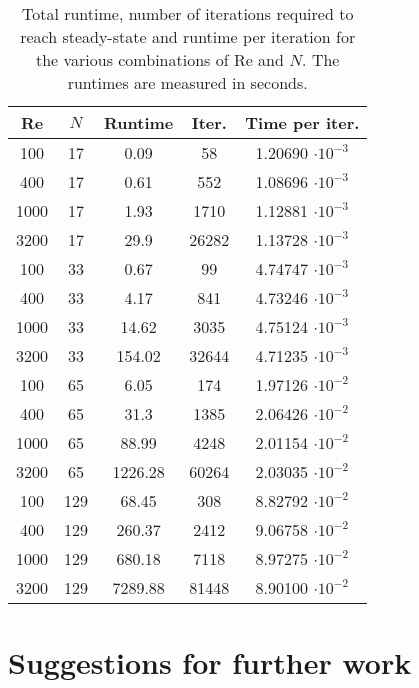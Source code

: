\documentclass[final,3p,twocolumn]{elsarticle}
\begin{document}
\begin{table}[htb]
    \centering
    \begin{tabular}{ccccc}
        \hline
        Re   & $N$ & Runtime & Iter. & Time per iter.          \\
        \hline
        100  & 17  & 0.09    & 58    & 1.20690 $\cdot 10^{-3}$ \\
        400  & 17  & 0.61    & 552   & 1.08696 $\cdot 10^{-3}$ \\
        1000 & 17  & 1.93    & 1710  & 1.12881 $\cdot 10^{-3}$ \\
        3200 & 17  & 29.9    & 26282 & 1.13728 $\cdot 10^{-3}$ \\
        \hline
        100  & 33  & 0.67    & 99    & 4.74747 $\cdot 10^{-3}$ \\ 
        400  & 33  & 4.17    & 841   & 4.73246 $\cdot 10^{-3}$ \\ 
        1000 & 33  & 14.62   & 3035  & 4.75124 $\cdot 10^{-3}$ \\ 
        3200 & 33  & 154.02  & 32644 & 4.71235 $\cdot 10^{-3}$ \\ 
        \hline
        100  & 65  & 6.05    & 174   & 1.97126 $\cdot 10^{-2}$ \\ 
        400  & 65  & 31.3    & 1385  & 2.06426 $\cdot 10^{-2}$ \\ 
        1000 & 65  & 88.99   & 4248  & 2.01154 $\cdot 10^{-2}$ \\ 
        3200 & 65  & 1226.28 & 60264 & 2.03035 $\cdot 10^{-2}$ \\ 
        \hline
        100  & 129 & 68.45   & 308   & 8.82792 $\cdot 10^{-2}$ \\ 
        400  & 129 & 260.37  & 2412  & 9.06758 $\cdot 10^{-2}$ \\ 
        1000 & 129 & 680.18  & 7118  & 8.97275 $\cdot 10^{-2}$ \\ 
        3200 & 129 & 7289.88 & 81448 & 8.90100 $\cdot 10^{-2}$ \\ 
        \hline
    \end{tabular}
    \caption
    {
        Total runtime, number of iterations required to reach steady-state and
        runtime per iteration for the various combinations of Re and $N$. The
        runtimes are measured in seconds. 
    }
    \label{tab:runtime}
\end{table}

\section{Suggestions for further work}
\label{sec:further}
\end{document}
